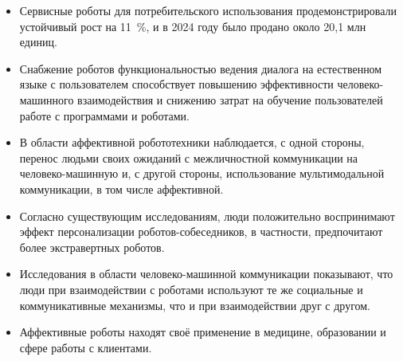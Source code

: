 \documentclass[12pt,a4paper]{article}
\begin{document}
	
	\begin{itemize}[label=--]
		\item Сервисные роботы для потребительского использования продемонстрировали устойчивый рост на 11~\%, и в 2024 году было продано около 20{,}1 млн единиц.
		
		\item Снабжение роботов функциональностью ведения диалога на естественном языке с пользователем способствует повышению эффективности человеко-машинного взаимодействия и снижению затрат на обучение пользователей работе с программами и роботами.
		
		\item В области аффективной робототехники наблюдается, с одной стороны, перенос людьми своих ожиданий с межличностной коммуникации на человеко-машинную и, с другой стороны, использование мультимодальной коммуникации, в том числе аффективной.
		
		\item Согласно существующим исследованиям, люди положительно воспринимают эффект персонализации роботов-собеседников, в частности, предпочитают более экстравертных роботов.
		
		\item Исследования в области человеко-машинной коммуникации показывают, что люди при взаимодействии с роботами используют те же социальные и коммуникативные механизмы, что и при взаимодействии друг с другом.
		
		\item Аффективные роботы находят своё применение в медицине, образовании и сфере работы с клиентами.
	\end{itemize}
	
\end{document}
